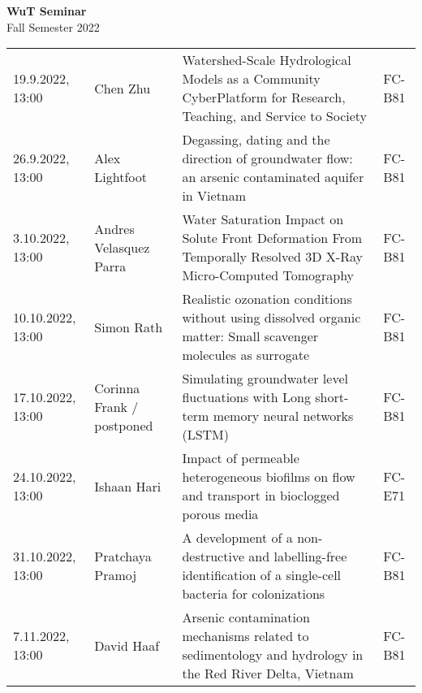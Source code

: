 \documentclass[12pt]{article}
\begin{document}
\centering

{\Huge \bf WuT Seminar}\\[1cm]
{\Large Fall Semester 2022}\\[1.8cm]





\renewcommand*\arraystretch{1.4}
\begin{tabular}{l p{3.8cm} p{8.5cm} p{2cm}}

19.9.2022, 13:00
 	& Chen Zhu
 	& Watershed-Scale Hydrological Models as a Community CyberPlatform for Research, Teaching, and Service to Society
  & FC-B81\\
  
26.9.2022, 13:00
 	& Alex Lightfoot
 	& Degassing, dating and the direction of groundwater flow: an arsenic contaminated aquifer in Vietnam
 	& FC-B81\\

3.10.2022, 13:00
 	& Andres Velasquez Parra
 	& Water Saturation Impact on Solute Front Deformation From Temporally Resolved 3D X-Ray Micro-Computed Tomography
 	& FC-B81\\

10.10.2022, 13:00
 	& Simon Rath
 	& Realistic ozonation conditions without using dissolved organic matter: Small scavenger molecules as surrogate
 	& FC-B81\\

17.10.2022, 13:00
 	& Corinna Frank / postponed
 	& Simulating groundwater level fluctuations with Long short-term memory neural networks (LSTM)
 	& FC-B81\\
 	
24.10.2022, 13:00
 	& Ishaan Hari
 	& Impact of permeable heterogeneous biofilms on flow and transport in bioclogged porous media
 	& FC-E71\\

31.10.2022, 13:00
 	& Pratchaya Pramoj
 	& A development of a non-destructive and labelling-free identification of a single-cell bacteria for colonizations
 	& FC-B81\\

7.11.2022, 13:00
 	& David Haaf
 	& Arsenic contamination mechanisms related to sedimentology and hydrology in the Red River Delta, Vietnam
 	& FC-B81\\


\end{tabular}
\end{document}

